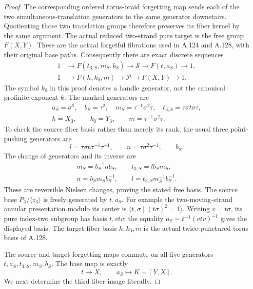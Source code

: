 \begin{proof}
The corresponding ordered torus-braid forgetting map sends each
of the two simultaneous-translation generators to the same
generator downstairs. Quotienting those two translation groups
therefore preserves its fiber kernel by the same argument.
The actual reduced two-strand pure target is the free group
\(F(X,Y)\). These are the actual forgetful fibrations used in
A.124 and A.128, with their original base paths.
Consequently there are exact discrete sequences
\[
 \begin{split}
 1&\longrightarrow F(t_{3,S},m_S,b_S)
   \longrightarrow\mathcal S
   \longrightarrow F(t,a_S)\longrightarrow1,\\
 1&\longrightarrow F(h,k_0,m)
   \longrightarrow\mathcal P
   \longrightarrow F(X,Y)\longrightarrow1.
 \end{split}
 \tag{A.134.7}
\]
The symbol \(k_0\) in this proof denotes a handle generator,
not the canonical profinite exponent \(k\).
The marked generators are
\[
 \begin{gathered}
 a_S=\sigma^2,\quad b_S=\tau^2,\quad
 m_S=\tau^{-1}\sigma^2\tau,\quad
 t_{3,S}=\tau\sigma t\sigma\tau,\\
 h=X_3,\qquad k_0=Y_3,\qquad
 m=\tau^{-1}\sigma^2\tau.
 \end{gathered}
 \tag{A.134.8}
\]
To check the source fiber basis rather than merely its rank,
the usual three point-pushing generators are
\[
 l=\tau\sigma t\sigma^{-1}\tau^{-1},\qquad
 n=\tau\sigma^2\tau^{-1},\qquad b_S.
\]
The change of generators and its inverse are
\[
 \begin{gathered}
 m_S=b_S^{-1}nb_S,\qquad t_{3,S}=l b_Sm_S,\\
 n=b_Sm_Sb_S^{-1},\qquad
 l=t_{3,S}m_S^{-1}b_S^{-1}.
 \end{gathered}
 \tag{A.134.9}
\]
These are reversible Nielsen changes, proving the stated free
basis. The source base \(P_3/\langle z_3\rangle\) is freely
generated by \(t,a_S\). For example the two-moving-strand
annular presentation modulo its center is
\(\langle t,\sigma\mid(t\sigma)^2=1\rangle\).
Writing \(v=t\sigma\), its pure index-two subgroup has basis
\(t,vtv\); the equality
\(a_S=t^{-1}(vtv)^{-1}\) gives the displayed basis.
The target fiber basis \(h,k_0,m\) is the actual
twice-punctured-torus basis of A.128.

The source and target forgetting maps commute on all five
generators \(t,a_S,t_{3,S},m_S,b_S\).
The base map is exactly
\[
             t\longmapsto X,\qquad
             a_S\longmapsto K=[Y,X].
 \tag{A.134.10}
\]
We next determine the third fiber image literally.


\end{proof}
